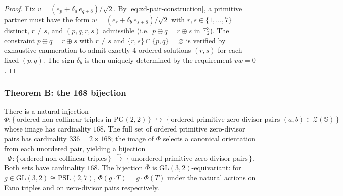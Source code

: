 \begin{proof}
Fix $v = (e_p + \delta_a\, e_{q+8})/\sqrt{2}$.  By
\eqref{eq:zd-pair-construction}, a primitive partner must have the form $w
= (e_r + \delta_b\, e_{s+8})/\sqrt{2}$ with $r,s\in\{1,\dots,7\}$
distinct, $r\neq s$, and $(p,q,r,s)$ admissible (i.e.\ $p\oplus q =
r\oplus s$ in $\mathbb{F}_2^3$).  The constraint $p\oplus q = r\oplus s$
with $r\neq s$ and $\{r,s\}\cap\{p,q\}=\varnothing$ is verified by
exhaustive enumeration to admit exactly $4$ ordered solutions $(r,s)$ for
each fixed $(p,q)$.  The sign $\delta_b$ is then uniquely determined by
the requirement $vw = 0$.
\end{proof}


\subsubsection*{Theorem B: the 168 bijection}

\begin{theorem}\label{thm:168-bijection}
There is a natural injection
\[
  \Phi\colon
  \bigl\{\,\text{ordered non-collinear triples in }\mathrm{PG}(2,2)\,\bigr\}
  \;\hookrightarrow\;
  \bigl\{\,\text{ordered primitive zero-divisor pairs }(a,b)\in
    \mathscr{Z}(\mathbb{S})\,\bigr\}
\]
whose image has cardinality $168$.  The full set of ordered primitive
zero-divisor pairs has cardinality $336 = 2\times 168$; the image of
$\Phi$ selects a canonical orientation from each unordered pair, yielding
a bijection
\[
  \bar\Phi\colon
  \bigl\{\,\text{ordered non-collinear triples}\,\bigr\}
  \;\xrightarrow{\;\sim\;}\;
  \bigl\{\,\text{unordered primitive zero-divisor pairs}\,\bigr\}.
\]
Both sets have cardinality $168$.  The bijection $\bar\Phi$ is
$\mathrm{GL}(3,2)$-equivariant: for $g\in\mathrm{GL}(3,2)\cong
\mathrm{PSL}(2,7)$, $\bar\Phi(g\cdot T) = g\cdot\bar\Phi(T)$ under the
natural actions on Fano triples and on zero-divisor pairs respectively.
\end{theorem}

